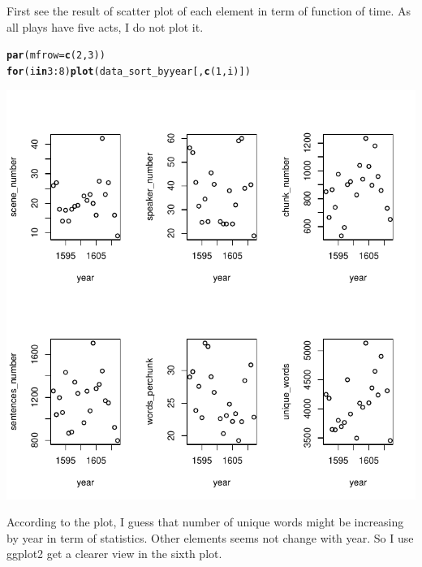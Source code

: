 \documentclass{article}\usepackage[]{graphicx}\usepackage[]{color}
\makeatletter
\def\maxwidth{ %
  \ifdim\Gin@nat@width>\linewidth
    \linewidth
  \else
    \Gin@nat@width
  \fi
}
\newcommand{\hlnum}[1]{\textcolor[rgb]{0.686,0.059,0.569}{#1}}%
\newcommand{\hlopt}[1]{\textcolor[rgb]{0,0,0}{#1}}%
\newcommand{\hlstd}[1]{\textcolor[rgb]{0.345,0.345,0.345}{#1}}%
\newcommand{\hlkwa}[1]{\textcolor[rgb]{0.161,0.373,0.58}{\textbf{#1}}}%
\newcommand{\hlkwc}[1]{\textcolor[rgb]{0.333,0.667,0.333}{#1}}%
\newcommand{\hlkwd}[1]{\textcolor[rgb]{0.737,0.353,0.396}{\textbf{#1}}}%
\newenvironment{kframe}{%
 \def\at@end@of@kframe{}%
 \ifinner\ifhmode%
  \def\at@end@of@kframe{\end{minipage}}%
  \begin{minipage}{\columnwidth}%
 \fi\fi%
 \def\FrameCommand##1{\hskip\@totalleftmargin \hskip-\fboxsep
 \colorbox{shadecolor}{##1}\hskip-\fboxsep
     \hskip-\linewidth \hskip-\@totalleftmargin \hskip\columnwidth}%
 \MakeFramed {\advance\hsize-\width
   \@totalleftmargin\z@ \linewidth\hsize
   \@setminipage}}%
 {\par\unskip\endMakeFramed%
 \at@end@of@kframe}
\newenvironment{knitrout}{}{} %
\makeatother
\begin{document}
First see the result of scatter plot of each element in term of function of time. As all plays have five acts, I do not plot it.
\begin{knitrout}
\color{fgcolor}\begin{kframe}
\begin{alltt}
\hlkwd{par}\hlstd{(}\hlkwc{mfrow}\hlstd{=}\hlkwd{c}\hlstd{(}\hlnum{2}\hlstd{,}\hlnum{3}\hlstd{))}
\hlkwa{for}\hlstd{(i} \hlkwa{in} \hlnum{3}\hlopt{:}\hlnum{8}\hlstd{)} \hlkwd{plot}\hlstd{(data_sort_byyear[,}\hlkwd{c}\hlstd{(}\hlnum{1}\hlstd{,i)])}
\end{alltt}
\end{kframe}
\includegraphics[width=\maxwidth]{figure/r-chunk14-1} 

\end{knitrout}

According to the plot, I guess that number of unique words might be increasing by year in term of statistics. Other elements seems not change with year.
So I use ggplot2 get a clearer view in the sixth plot.
\end{document}

